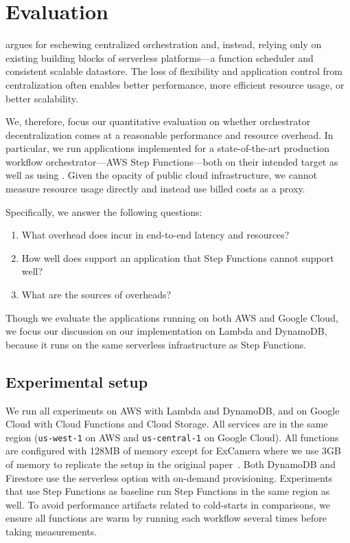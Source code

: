 \section{Evaluation}\label{sec:eval}

\name{} argues for eschewing centralized orchestration and, instead, relying
only on existing building blocks of serverless platforms---a function scheduler
and consistent scalable datastore. The loss of flexibility and application
control from centralization often enables better performance, more efficient
resource usage, or better scalability.

We, therefore, focus our quantitative evaluation on whether orchestrator
decentralization comes at a reasonable performance and resource overhead. In
particular, we run applications implemented for a state-of-the-art
production workflow orchestrator---AWS Step Functions---both on their intended
target as well as using \name{}. Given the opacity of public cloud
infrastructure, we cannot measure resource usage directly and instead use billed
costs as a proxy.

Specifically, we answer the following questions:


\begin{enumerate}

  \item What overhead does \name{} incur in end-to-end latency and resources?

  \item How well does \name{} support an application that Step Functions cannot support well?

  \item What are the sources of  overheads?

\end{enumerate}

Though we evaluate the applications running on both AWS and Google Cloud, we
focus our discussion on our \name{} implementation on Lambda and DynamoDB,
because it runs on the same serverless infrastructure as Step Functions.

\subsection{Experimental setup}

We run all experiments on AWS with Lambda and DynamoDB, and on Google Cloud
with Cloud Functions and Cloud Storage. All services are in the same region
(\texttt{us-west-1} on AWS and \texttt{us-central-1} on Google Cloud). All
functions are configured with 128MB of memory except for ExCamera where we use
3GB of memory to replicate the setup in the original paper~\cite{excamera,
gg-atc}. Both DynamoDB and Firestore use the serverless option with on-demand
provisioning. Experiments that use Step Functions as baseline run Step
Functions in the same region as well. To avoid performance artifacts related
to cold-starts in comparisons, we ensure all functions are warm by running
each workflow several times before taking measurements.

